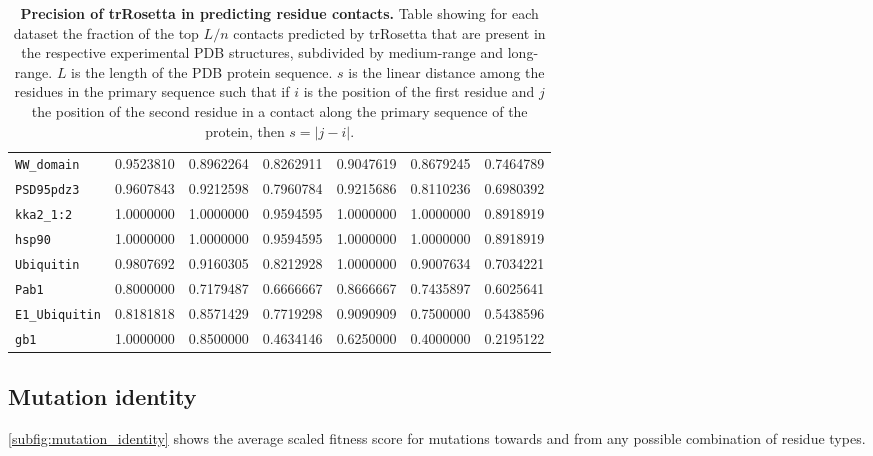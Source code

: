 \begin{table}[p]
{\begin{tabular*}{\linewidth}{@{\extracolsep{\fill}}lrrrrrr}
			\texttt{WW\_domain}     & \num{0.9523810} & \num{0.8962264} & \num{0.8262911} & \num{0.9047619} & \num{0.8679245} & \num{0.7464789} \\
			\texttt{PSD95pdz3}      & \num{0.9607843} & \num{0.9212598} & \num{0.7960784} & \num{0.9215686} & \num{0.8110236} & \num{0.6980392} \\
			\texttt{kka2\_1:2}      & \num{1.0000000} & \num{1.0000000} & \num{0.9594595} & \num{1.0000000} & \num{1.0000000} & \num{0.8918919} \\
			\texttt{hsp90}          & \num{1.0000000} & \num{1.0000000} & \num{0.9594595} & \num{1.0000000} & \num{1.0000000} & \num{0.8918919} \\
			\texttt{Ubiquitin}      & \num{0.9807692} & \num{0.9160305} & \num{0.8212928} & \num{1.0000000} & \num{0.9007634} & \num{0.7034221} \\
			\texttt{Pab1}           & \num{0.8000000} & \num{0.7179487} & \num{0.6666667} & \num{0.8666667} & \num{0.7435897} & \num{0.6025641} \\
			\texttt{E1\_Ubiquitin}  & \num{0.8181818} & \num{0.8571429} & \num{0.7719298} & \num{0.9090909} & \num{0.7500000} & \num{0.5438596} \\
			\texttt{gb1}            & \num{1.0000000} & \num{0.8500000} & \num{0.4634146} & \num{0.6250000} & \num{0.4000000} & \num{0.2195122} \\
			\bottomrule
		\end{tabular*}%
	}{\caption[Precision of trRosetta in predicting residue contacts]{%
			\textbf{Precision of trRosetta in predicting residue contacts.}
			Table showing for each dataset the fraction of the top $L/n$ contacts predicted by trRosetta that are present in the respective experimental PDB structures, subdivided by medium-range and long-range.
			$L$ is the length of the PDB protein sequence.
			$s$ is the linear distance among the residues in the primary sequence such that if $i$ is the position of the first residue and $j$ the position of the second residue in a contact along the primary sequence of the protein, then $s = |j-i|$.
		}\label{tab:trrosetta_validation}}%
\end{table}

\subsection{Mutation identity}
\autoref{subfig:mutation_identity} shows the average scaled fitness score for mutations towards and from any possible combination of residue types.

